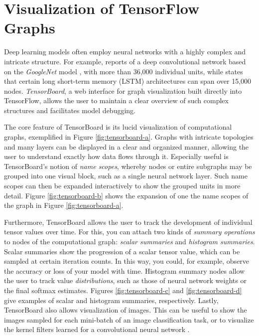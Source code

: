 \section{Visualization of TensorFlow Graphs}\label{sec:visual}

Deep learning models often employ neural networks with a highly complex and
intricate structure. For example, \cite{tensorflow} reports of a deep
convolutional network based on the \emph{GoogleNet} model \cite{inception}, with
more than 36,000 individual units, while \cite{tensorflow} states that certain
long short-term memory (LSTM) architectures can span over 15,000
nodes. \emph{TensorBoard}, a web interface for graph visualization built
directly into TensorFlow, allows the user to maintain a clear overview of such
complex structures and facilitates model debugging.

The core feature of TensorBoard is its lucid visualization of computational
graphs, exemplified in Figure \ref{fig:tensorboard-a}. Graphs with intricate
topologies and many layers can be displayed in a clear and organized manner,
allowing the user to understand exactly how data flows through it. Especially
useful is TensorBoard's notion of \emph{name scopes}, whereby nodes or entire
subgraphs may be grouped into one visual block, such as a single neural network
layer. Such name scopes can then be expanded interactively to show the grouped
units in more detail. Figure \ref{fig:tensorboard-b} shows the expansion of one
the name scopes of the graph in Figure \ref{fig:tensorboard-a}.

Furthermore, TensorBoard allows the user to track the development of individual
tensor values over time. For this, you can attach two kinds of \emph{summary
  operations} to nodes of the computational graph: \emph{scalar summaries} and
\emph{histogram summaries}. Scalar summaries show the progression of a scalar
tensor value, which can be sampled at certain iteration counts. In this way, you
could, for example, observe the accuracy or loss of your model with
time. Histogram summary nodes allow the user to track value
\emph{distributions}, such as those of neural network weights or the final
softmax estimates. Figures \ref{fig:tensorboard-c} and \ref{fig:tensorboard-d}
give examples of scalar and histogram summaries, respectively. Lastly,
TensorBoard also allows visualization of images. This can be useful to show the
images sampled for each mini-batch of an image classification task, or to
visualize the kernel filters learned for a convolutional neural network
\cite{tensorflow}.

